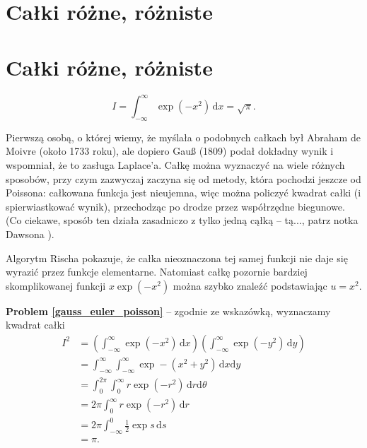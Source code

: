 
\section{Całki różne, różniste}
\section{Całki różne, różniste}

\begin{problem_with_solution}
    \label{gauss_euler_poisson}%
    \begin{equation}
        I = \int_{-\infty}^\infty \exp \left( -x^2 \right) \,\mathrm{d} x = \sqrt{\pi}.
    \end{equation}
\end{problem_with_solution}

Pierwszą osobą, o której wiemy, że myślała o podobnych całkach był Abraham de Moivre (około 1733 roku), ale dopiero Gauß (1809) podał dokładny wynik i wspomniał, że to zasługa Laplace'a.
Całkę można wyznaczyć na wiele różnych sposobów, przy czym zazwyczaj zaczyna się od metody, która pochodzi jeszcze od Poissona: całkowana funkcja jest nieujemna, więc można policzyć kwadrat całki (i spierwiastkować wynik), przechodząc po drodze przez współrzędne biegunowe.
(Co ciekawe, sposób ten działa zasadniczo z tylko jedną cąłką -- tą..., patrz notka Dawsona \cite{dawson05}).

Algorytm Rischa pokazuje, że całka nieoznaczona tej samej funkcji nie daje się wyrazić przez funkcje elementarne.
Natomiast całkę pozornie bardziej skomplikowanej funkcji $x \exp (-x^2)$ można szybko znaleźć podstawiając $u = x^2$.

\textbf{Problem \ref{gauss_euler_poisson}} -- zgodnie ze wskazówką, wyznaczamy kwadrat całki
\begin{align}
    I^2 & = \left(\int_{-\infty}^\infty \exp \left( -x^2 \right) \,\mathrm{d}x\right)\left(\int_{-\infty}^\infty \exp \left( -y^2 \right) \,\mathrm{d}y\right) \\
    & = \int_{-\infty}^\infty \int_{-\infty}^\infty \exp - \left(x^2+y^2\right) \,\mathrm{d}x \mathrm{d}y \\
    & = \int_0^{2\pi} \int_0^\infty r \exp (-r^2) \,\mathrm{d}r \mathrm{d}\theta \\
    & = 2\pi \int_0^\infty r \exp (-r^2) \,\mathrm{d} r \\
    & = 2\pi \int^0_{-\infty} \frac 1 2 \exp s \,\mathrm{d} s \\
    & = \pi.
\end{align}

